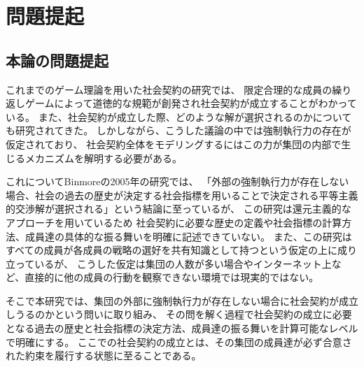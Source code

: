 \chapter{問題提起}
\section{本論の問題提起}
これまでのゲーム理論を用いた社会契約の研究では、
限定合理的な成員の繰り返しゲームによって道徳的な規範が創発され社会契約が成立することがわかっている\cite{skyrms1996}\cite{skyrms2004}。
また、社会契約が成立した際、どのような解が選択されるのかについても研究されてきた。\cite{rawls1971}\cite{harsanyi1955}\cite{gauthier1986morals}
しかしながら、こうした議論の中では強制執行力の存在が仮定されており、
社会契約全体をモデリングするにはこの力が集団の内部で生じるメカニズムを解明する必要がある。

これについてBinmoreの2005年の研究\cite{binmore2005}では、
「外部の強制執行力が存在しない場合、社会の過去の歴史が決定する社会指標を用いることで決定される平等主義的交渉解が選択される」という結論に至っているが、
この研究は還元主義的なアプローチを用いているため
社会契約に必要な歴史の定義や社会指標の計算方法、成員達の具体的な振る舞いを明確に記述できていない。
また、この研究はすべての成員が各成員の戦略の選好を共有知識として持つという仮定の上に成り立っているが、
こうした仮定は集団の人数が多い場合やインターネット上など、直接的に他の成員の行動を観察できない環境では現実的ではない。

そこで本研究では、集団の外部に強制執行力が存在しない場合に社会契約が成立しうるのかという問いに取り組み、
その問を解く過程で社会契約の成立に必要となる過去の歴史と社会指標の決定方法、成員達の振る舞いを計算可能なレベルで明確にする。
ここでの社会契約の成立とは、その集団の成員達が必ず合意された約束を履行する状態に至ることである。


